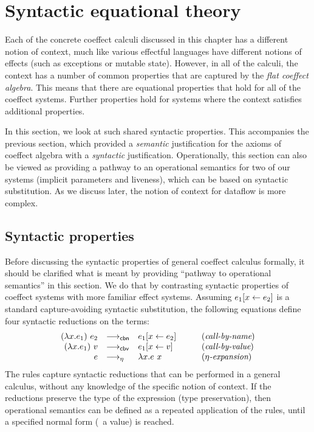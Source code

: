 \section{Syntactic equational theory}
\label{sec:flat-syntax}

Each of the concrete coeffect calculi discussed in this chapter has a different notion of context,
much like various effectful languages have different notions of effects (such as exceptions or
mutable state). However, in all of the calculi, the context has a number of common properties that
are captured by the \emph{flat coeffect algebra}. This means that there are equational properties
that hold for all of the coeffect systems. Further properties hold for systems where the context
satisfies additional properties.

In this section, we look at such shared syntactic properties. This accompanies the previous section,
which provided a \emph{semantic} justification for the axioms of coeffect algebra with a
\emph{syntactic} justification. Operationally, this section can also be viewed as providing a
pathway to an operational semantics for two of our systems (implicit parameters and liveness),
which can be based on syntactic substitution. As we discuss later, the notion of context for
dataflow is more complex.


\subsection{Syntactic properties}
\label{sec:flat-syntax-props}

Before discussing the syntactic properties of general coeffect calculus formally, it should be
clarified what is meant by providing ``pathway to operational semantics'' in this section. We do
that by contrasting syntactic properties of coeffect systems with more familiar effect systems.
Assuming $e_1[x \leftarrow e_2]$ is a standard capture-avoiding syntactic substitution, the following
equations define four syntactic reductions on the terms:
%
\begin{equation*}
\begin{array}{rllcl}
(\lambda x.e_1)~e_2 &{\longrightarrow_{\textnormal{\sffamily cbn}}}& e_1[x \leftarrow e_2]   &&(\textit{call-by-name})\\
(\lambda x.e_1)~v   &{\longrightarrow_{\textnormal{\sffamily cbv}}}& e_1[x \leftarrow v]     &\quad&(\textit{call-by-value})\\
e &{\longrightarrow_\eta}& \lambda x.e~x                                    &&(\textit{$\eta$-expansion})
\end{array}
\end{equation*}
%
The rules capture syntactic reductions that can be performed in a general calculus, without any
knowledge of the specific notion of context. If the reductions preserve the type of the expression
(type preservation), then operational semantics can be defined as a repeated application of the
rules, until a specified normal form (\ie~a value) is reached.

